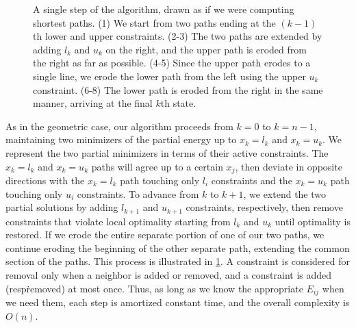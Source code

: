 \documentclass[11pt]{article}
\begin{document}
\begin{figure}
\begin{center}
\end{center}
\caption{A single step of the algorithm, drawn as if we were computing shortest paths.
(1) We start from two paths ending at the $(k-1)$th lower and upper constraints.
(2-3) The two paths are extended by adding $l_k$ and $u_k$ on the right, and the upper path is eroded from the right as far as possible.
(4-5) Since the upper path erodes to a single line, we erode the lower path from the left using the upper $u_k$ constraint.
(6-8) The lower path is eroded from the right in the same manner, arriving at the final $k$th state.
\label{erode}}
\end{figure}

As in the geometric case, our algorithm proceeds from $k = 0$ to $k = n-1$, maintaining two minimizers of the partial energy up to $x_k = l_k$ and $x_k = u_k$.  We represent the two partial minimizers in terms of
their active constraints.  The $x_k = l_k$ and $x_k = u_k$ paths will agree up to a certain $x_j$, then deviate
in opposite directions with the $x_k = l_k$ path touching only $l_i$ constraints and the $x_k = u_k$ path touching only $u_i$ constraints.  To advance from $k$ to $k+1$, we extend the two partial solutions by adding
$l_{k+1}$ and $u_{k+1}$ constraints, respectively, then remove constraints that violate local optimality starting from $l_k$ and $u_k$ until optimality is restored.  If we erode the entire separate
portion of one of our two paths, we continue eroding the beginning of the other separate path, extending the common section of the paths.  This process is illustrated in \cref{erode}.
A constraint is considered for removal only when a neighbor is added or removed, and a constraint is added (resp\. removed) at most once.  Thus, as long as we know the appropriate $E_{ij}$ when we need them, each step
is amortized constant time, and the overall complexity is $O(n)$.
\end{document}
